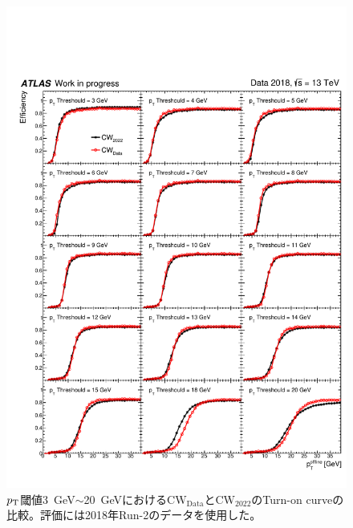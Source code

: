 \begin{figure}[p]
  \centering
  \includegraphics[clip, width=14cm]{fig/5/c1.pdf}
  \caption{$p_{\rm{T}}$閾値3~GeV$\sim$20~GeVにおける$\mathrm{CW_{Data}}$と$\mathrm{CW_{2022}}$のTurn-on curveの比較。評価には2018年Run-2のデータを使用した。}
  \label{fig:v05v06_1_9_Data}
\end{figure}



